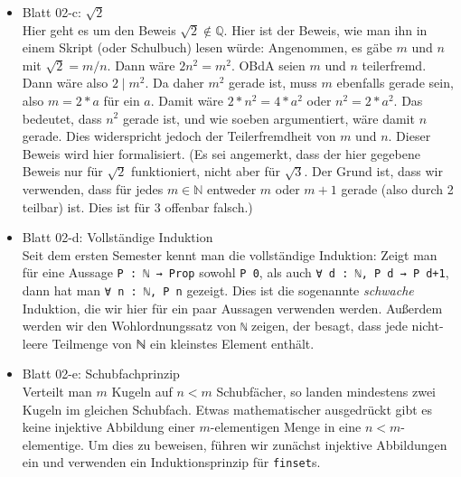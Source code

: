\documentclass[11pt]{article}
\newcommand{\leanstate}{\texttt}
\begin{document}
\begin{itemize}
  \item Blatt 02-c: $\sqrt 2$\\ %
    Hier geht es um den Beweis $\sqrt 2 \notin \mathbb Q$. Hier ist der Beweis, wie man ihn in einem Skript (oder Schulbuch) lesen würde: Angenommen, es gäbe $m$ und $n$ mit $\sqrt{2} = m/n$. Dann wäre $2n^2 = m^2$. OBdA seien $m$ und $n$ teilerfremd. Dann wäre also $2 ∣ m^2$. Da daher $m^2$ gerade ist, muss $m$ ebenfalls gerade sein, also $m = 2*a$ für ein $a$. Damit wäre $2*n^2 = 4 * a^2$ oder $n^2 = 2 * a^2$. Das bedeutet, dass $n^2$ gerade ist, und wie soeben argumentiert, wäre damit $n$ gerade. Dies widerspricht jedoch der Teilerfremdheit von $m$ und $n$. Dieser Beweis wird hier formalisiert. (Es sei angemerkt, dass der hier gegebene Beweis nur für $\sqrt 2$ funktioniert, nicht aber für $\sqrt 3$. Der Grund ist, dass wir verwenden, dass für jedes $m\in\mathbb N$ entweder $m$ oder $m+1$ gerade (also durch 2 teilbar) ist. Dies ist für $3$ offenbar falsch.)
\item Blatt 02-d: Vollständige Induktion\\ %
Seit dem ersten Semester kennt man die vollständige Induktion: Zeigt man für eine Aussage \leanstate{P : ℕ → Prop} sowohl \leanstate{P 0}, als auch \leanstate{∀ d : ℕ, P d → P d+1}, dann hat man \leanstate{∀ n : ℕ, P n} gezeigt. Dies ist die sogenannte {\em schwache} Induktion, die wir hier für ein paar Aussagen verwenden werden. Außerdem werden wir den Wohlordnungssatz von \leanstate{ℕ} zeigen, der besagt, dass jede nicht-leere Teilmenge von ℕ ein kleinstes Element enthält. 
\item Blatt 02-e: Schubfachprinzip \\ %
Verteilt man $m$ Kugeln auf $n<m$ Schubfächer, so landen mindestens zwei Kugeln im gleichen Schubfach. Etwas mathematischer ausgedrückt gibt es keine injektive Abbildung einer $m$-elementigen Menge in eine $n<m$-elementige. Um dies zu beweisen, führen wir zunächst injektive Abbildungen ein und verwenden ein Induktionsprinzip für \leanstate{finset}s.
\end{itemize}
\end{document}
